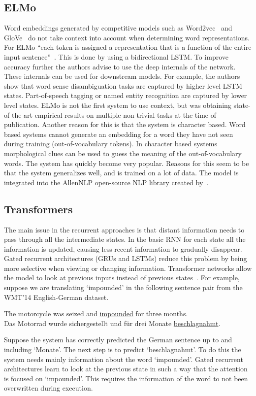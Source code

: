 \subsection{ELMo}
\label{subsec:elmo}
Word embeddings generated by competitive models such as Word2vec~\citep{mikolov2013distributed} and GloVe~\citep{pennington2014} do not take context into account when determining word representations.
For ELMo ``each token is assigned a representation that is a function of the entire input sentence''~\citep{peters2018}.
This is done by using a bidirectional LSTM.
To improve accuracy further the authors advise to use the deep internals of the network.
These internals can be used for downstream models.
For example, the authors show that word sense disambiguation tasks are captured by higher level LSTM states.
Part-of-speech tagging or named entity recognition are captured by lower level states.
ELMo is not the first system to use context, but was obtaining state-of-the-art empirical results on multiple non-trivial tasks at the time of publication.
Another reason for this is that the system is character based.
Word based systems cannot generate an embedding for a word they have not seen during training (out-of-vocabulary tokens).
In character based systems morphological clues can be used to guess the meaning of the out-of-vocabulary words.
The system has quickly become very popular.
Reasons for this seem to be that the system generalizes well, and is trained on a lot of data.
The model is integrated into the AllenNLP open-source NLP library created by~\citet{gardner2017}.

\subsection{Transformers}
\label{subsec:transformers}
The main issue in the recurrent approaches is that distant information needs to pass through all the intermediate states.
In the basic RNN for each state all the information is updated, causing less recent information to gradually disappear.
Gated recurrent architectures (GRUs and LSTMs) reduce this problem by being more selective when viewing or changing information.
Transformer networks allow the model to look at previous inputs instead of previous states~\citet{vaswani2017attention}.
For example, suppose we are translating `impounded' in the following sentence pair from the WMT'14 English-German dataset.
\begin{center}
    The motorcycle was seized and \underline{impounded} for three months.\\[3mm]
    Das Motorrad wurde sichergestellt und f\"ur drei Monate \underline{beschlagnahmt}.
\end{center}
Suppose the system has correctly predicted the German sentence up to and including `Monate'.
The next step is to predict `beschlagnahmt'.
To do this the system needs mainly information about the word `impounded'.
Gated recurrent architectures learn to look at the previous state in such a way that the attention is focused on `impounded'.
This requires the information of the word to not been overwritten during execution.


